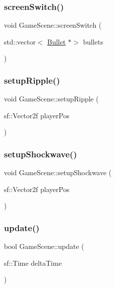\subsubsection{\texorpdfstring{screen\+Switch()}{screenSwitch()}}
{\footnotesize\ttfamily void Game\+Scene\+::screen\+Switch (\begin{DoxyParamCaption}\item[{std\+::vector$<$ \hyperlink{class_bullet}{Bullet} $\ast$$>$}]{bullets }\end{DoxyParamCaption})}

\mbox{\label{class_game_scene_aca0b30f731595929fb7182e2f65941b1}} 
\subsubsection{\texorpdfstring{setup\+Ripple()}{setupRipple()}}
{\footnotesize\ttfamily void Game\+Scene\+::setup\+Ripple (\begin{DoxyParamCaption}\item[{sf\+::\+Vector2f}]{player\+Pos }\end{DoxyParamCaption})}

\mbox{\label{class_game_scene_a67664e1bbce6bec9eda855a9b109d9ec}} 
\subsubsection{\texorpdfstring{setup\+Shockwave()}{setupShockwave()}}
{\footnotesize\ttfamily void Game\+Scene\+::setup\+Shockwave (\begin{DoxyParamCaption}\item[{sf\+::\+Vector2f}]{player\+Pos }\end{DoxyParamCaption})}

\mbox{\label{class_game_scene_ae54628d2f041bcad66242584b2db10d6}} 
\subsubsection{\texorpdfstring{update()}{update()}}
{\footnotesize\ttfamily bool Game\+Scene\+::update (\begin{DoxyParamCaption}\item[{sf\+::\+Time}]{delta\+Time }\end{DoxyParamCaption})\hspace{0.3cm}{\ttfamily [virtual]}}



